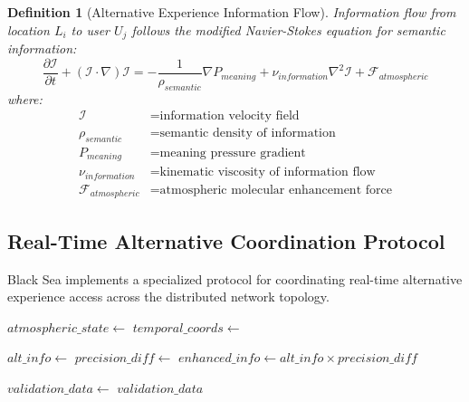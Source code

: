 \documentclass[12pt,a4paper]{article}
\newtheorem{definition}{Definition}
\begin{document}
\begin{definition}[Alternative Experience Information Flow]
Information flow from location $L_i$ to user $U_j$ follows the modified Navier-Stokes equation for semantic information:
\begin{equation}
\frac{\partial \mathcal{I}}{\partial t} + (\mathcal{I} \cdot \nabla)\mathcal{I} = -\frac{1}{\rho_{semantic}}\nabla P_{meaning} + \nu_{information}\nabla^2\mathcal{I} + \mathcal{F}_{atmospheric}
\end{equation}
where:
\begin{align}
\mathcal{I} &= \text{information velocity field} \\
\rho_{semantic} &= \text{semantic density of information} \\
P_{meaning} &= \text{meaning pressure gradient} \\
\nu_{information} &= \text{kinematic viscosity of information flow} \\
\mathcal{F}_{atmospheric} &= \text{atmospheric molecular enhancement force}
\end{align}
\end{definition}

\subsection{Real-Time Alternative Coordination Protocol}

Black Sea implements a specialized protocol for coordinating real-time alternative experience access across the distributed network topology.

\begin{algorithm}
\caption{Real-Time Alternative Coordination Protocol}
\begin{algorithmic}[1]
    \State $atmospheric\_state \gets$ 
    \State $temporal\_coords \gets$ 
    
        \State $alt\_info \gets$ 
        \State $precision\_diff \gets$ 
        \State $enhanced\_info \gets alt\_info \times precision\_diff$
        \State {}
    \EndFor
    
    \State $validation\_data \gets$ 
    \Return $validation\_data$
\EndProcedure
\end{algorithmic}
\end{algorithm}
\end{document}
